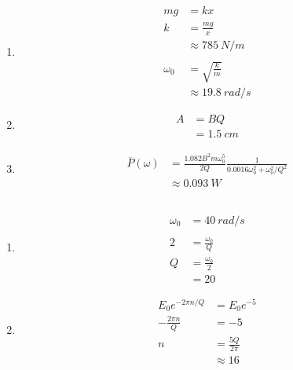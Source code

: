 \documentclass{article}
\begin{document}
\subsection{}

\begin{enumerate}
  \item

        \begin{align*}
          m g      & = k x                     \\
          k        & = \frac{m g}{x}           \\
                   & \approx \qty{785}{N/m}    \\ \\
          \omega_0 & = \sqrt{\frac{k}{m}}      \\
                   & \approx \qty{19.8}{rad/s}
        \end{align*}

  \item

        \begin{align*}
          A & = B Q           \\
            & = \qty{1.5}{cm}
        \end{align*}

  \item

        \begin{align*}
          \overline{P}(\omega) & = \frac{1.082 B^2 m \omega_0^5}{2 Q} \frac{1}{0.0016 \omega_0^2 + \omega_0^2 / Q^2} \\
                               & \approx \qty{0.093}{W}
        \end{align*}
\end{enumerate}

\subsection{}

\begin{enumerate}
  \item

        \begin{align*}
          \omega_0 & = \qty{40}{rad/s}    \\ \\
          2        & = \frac{\omega_0}{Q} \\
          Q        & = \frac{\omega_0}{2} \\
                   & = 20
        \end{align*}

  \item

        \begin{align*}
          E_0 e^{-2 \pi n / Q} & = E_0 e^{-5}        \\
          -\frac{2 \pi n}{Q}   & = -5                \\
          n                    & = \frac{5 Q}{2 \pi} \\
                               & \approx 16
        \end{align*}
\end{enumerate}
\end{document}
